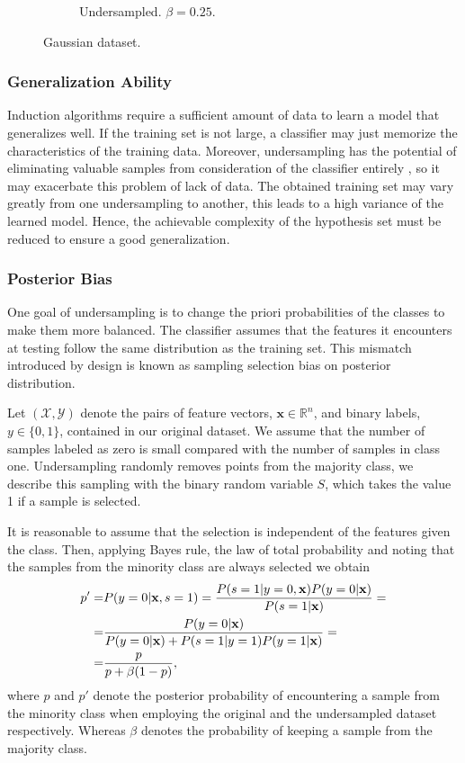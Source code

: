 \documentclass[conference]{IEEEtran}
\begin{document}
\begin{figure}
\begin{subfigure}[b]{0.24\textwidth}
			         \caption{Undersampled. $\beta=0.25$.}
			         \label{fig:Undersampling_2D_UndersampledDataset}
			     \end{subfigure}
			        \caption{Gaussian dataset.}
			        \label{fig:Undersampling_2D_OriginalHistograms}
			\end{figure}

	\subsubsection{Generalization Ability}
		Induction algorithms require a sufficient amount of data to learn a model that generalizes well.  If the training set is not large, a classifier may just memorize the characteristics of the training data. Moreover, undersampling has the potential of eliminating valuable samples from consideration of the classifier entirely \cite{undersampling_generalization}, so it may exacerbate this problem of lack of data. The obtained training set may vary greatly from one undersampling to another, this leads to a high variance of the learned model. Hence, the achievable complexity of the hypothesis set must be reduced to ensure a good generalization.
		
	\subsubsection{Posterior Bias}
		One goal of undersampling is to change the priori probabilities of the classes to make them more balanced. The classifier assumes that the features it encounters at testing follow the same distribution as the training set. This mismatch introduced by design is known as sampling selection bias \cite{sampling_bias} on posterior distribution.

		Let $(\mathcal{X}, \mathcal{Y})$ denote the pairs of feature vectors, $\mathbf{x} \in \mathbb{R}^n$,  and binary labels, $y \in \{0, 1\}$, contained in our original dataset. We assume that the number of samples labeled as zero is small compared with the number of samples in class one. Undersampling randomly removes points from the majority class, we describe this sampling with the binary random variable $S$, which takes the value 1 if a sample is selected.

		It is reasonable to assume that the selection is independent of the features given the class. Then, applying Bayes rule, the law of total probability and noting that the samples from the minority class are always selected we obtain
		\begin{align*} \label{posterior}
			p' = & P(y=0|\mathbf{x}, s=1)=  \frac{P(s=1|y=0, \mathbf{x})P(y=0|\mathbf{x})}{P(s=1|\mathbf{x})}=\notag\\
					=&  \frac{P(y=0|\mathbf{x})}{P(y=0|\mathbf{x})+P(s=1|y=1)P(y=1|\mathbf{x})}=\notag\\
=&\frac{p}{p+\beta(1-p)},
		\end{align*}
where $p$ and $p'$ denote the posterior probability of encountering a sample from the minority class when employing the original and the undersampled dataset respectively. Whereas $\beta$ denotes the probability of keeping a sample from the majority class.
\end{document}
